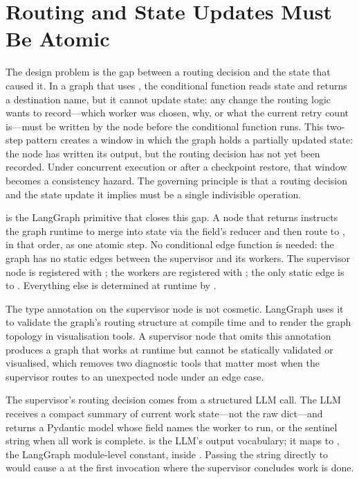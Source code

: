 \section{Routing and State Updates Must Be Atomic}
\label{sec:sup-command}

The design problem is the gap between a routing decision and the state
that caused it. In a graph that uses , the
conditional function reads state and returns a destination name, but it
cannot update state: any change the routing logic wants to record---which
worker was chosen, why, or what the current retry count is---must be
written by the node before the conditional function runs. This two-step
pattern creates a window in which the graph holds a partially updated
state: the node has written its output, but the routing decision has not
yet been recorded. Under concurrent execution or after a checkpoint
restore, that window becomes a consistency hazard. The governing principle
is that a routing decision and the state update it implies must be a single
indivisible operation.

 is the LangGraph primitive that closes this gap. A node
that returns 
instructs the graph runtime to merge  into state via the
field's reducer and then route to , in that order, as one
atomic step. No conditional edge function is needed: the graph has no
static edges between the supervisor and its workers. The supervisor node
is registered with ; the workers are registered with
; the only static edge is  to
. Everything else is determined at runtime by
.

The type annotation  on the supervisor node is
not cosmetic. LangGraph uses it to validate the graph's routing structure
at compile time and to render the graph topology in visualisation tools.
A supervisor node that omits this annotation produces a graph that works at
runtime but cannot be statically validated or visualised, which removes two
diagnostic tools that matter most when the supervisor routes to an
unexpected node under an edge case.

The supervisor's routing decision comes from a structured LLM call. The
LLM receives a compact summary of current work state---not the raw
 dict---and returns a  Pydantic
model whose  field names the worker to run, or the
sentinel string  when all work is complete.
 is the LLM's output vocabulary; it maps to ,
the LangGraph module-level constant, inside .
Passing the string  directly to  would
cause a  at the first invocation where the
supervisor concludes work is done.

